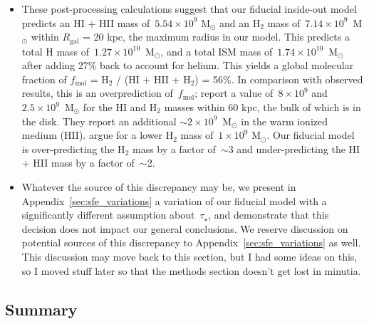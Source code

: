 \documentclass[fleqn, usenatbib]{mnras}
\begin{document}
\begin{itemize}
\begin{itemize}
		\item These post-processing calculations suggest that our fiducial 
		inside-out model predicts an HI + HII mass of~$5.54\times10^9$ 
		M$_\odot$ and an H$_2$ mass of~$7.14\times10^9$~M$_\odot$ within 
		$R_\text{gal}$ = 20 kpc, the maximum radius in our model. This 
		predicts a total H mass of~$1.27\times10^{10}$~M$_\odot$, and a total 
		ISM mass of~$1.74\times10^{10}$~M$_\odot$ after adding 27\% back to 
		account for helium. This yields a global molecular fraction of 
		$f_\text{mol}$ = H$_2$ / (HI + HII + H$_2$) = 56\%. In comparison with 
		observed results, this is an overprediction of~$f_\text{mol}$; 
		\citet{Kalberla2009} report a value of~$8\times10^9$ and 
		$2.5\times10^9$~M$_\odot$ for the HI and H$_2$ masses within 60 kpc, 
		the bulk of which is in the disk. They report an additional 
		$\sim2\times10^9$~M$_\odot$ in the warm ionized medium (HII). 
		\citet{Heyer2015} argue for a lower H$_2$ mass of~$1\times10^9$ 
		M$_\odot$. Our fiducial model is over-predicting the H$_2$ mass by a 
		factor of~$\sim$3 and under-predicting the HI + HII mass by a factor 
		of~$\sim$2. 

		\item Whatever the source of this discrepancy may be, we present in 
		Appendix~\ref{sec:sfe_variations} a variation of our fiducial model 
		with a significantly different assumption about~$\tau_\star$, and 
		demonstrate that this decision does not impact our general 
		conclusions. We reserve discussion on potential sources of this 
		discrepancy to Appendix~\ref{sec:sfe_variations} as well. {\color{red} 
		This discussion may move back to this section, but I had some ideas 
		on this, so I moved stuff later so that the methods section doesn't 
		get lost in minutia. }
	\end{itemize} 
\end{itemize} 

\subsection{Summary} 
\label{sec:methods:summary} 
\end{document}
